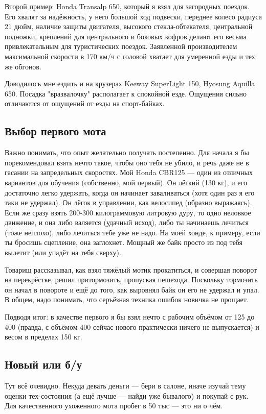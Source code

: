 \documentclass[12pt,a4paper]{article}
\begin{document}
Второй пример: Honda Transalp 650, который я взял для загородных поездок.
Его хвалят за надёжность, у него большой ход подвески, переднее колесо
радиуса 21 дюйм, наличие защиты двигателя, высокого стекла-обтекателя,
центральной подножки, креплений для центрального и боковых кофров делают
его весьма привлекательным для туристических поездок. Заявленной
производителем максимальной скорости в 170 км/ч с головой хватает для
умеренной езды и тех же обгонов.

Доводилось мне ездить и на крузерах Keeway SuperLight 150,
Hyosung Aquilla 650. Посадка "вразвалочку" располагает к спокойной езде.
Ощущения сильно отличаются от ощущений от езды на спорт-байках.

\subsection{Выбор первого мота}

Важно понимать, что опыт желательно получать постепенно. Для начала я
бы порекомендовал взять нечто такое, чтобы оно тебя не убило, и речь
даже не в гасании на запредельных скоростях. Мой Honda CBR125 --- один из
отличных вариантов для обучения (собственно, мой первый). Он лёгкий
(130 кг), и его достаточно легко удержать, когда он начинает
заваливаться (хотя один раз я его таки не удержал). Он лёгок в
управлении, как велосипед (образно выражаясь). Если же сразу взять
200-300 килограммовую литровую дуру, то одно неловкое движение, и она
либо валяется (удачный исход), либо ты начинаешь лечиться (тоже
неплохо), либо лечиться тебе уже не надо.
На моей хонде, к примеру, если ты бросишь сцепление, она заглохнет.
Мощный же байк просто из под тебя вылетит (или упадёт на тебя сверху).

Товарищ рассказывал, как взял тяжёлый мотик прокатиться, и совершая
поворот на перекрёстке, решил притормозить, пропуская пешехода.
Поскольку тормозить он начал в повороте и ещё до того, как выровнял
байк он его не удержал и упал. В общем, надо понимать, что серъёзная
техника ошибок новичка не прощает.

Подводя итог: в качестве первого я бы взял нечто с рабочим объёмом от
125 до 400 (правда, с объёмом 400 сейчас нового практически ничего не
выпускается) и весом в пределах 150 кг.

\subsection{Новый или б/у}

Тут всё очевидно. Некуда девать деньги --- бери в салоне, иначе изучай
тему оценки тех-состояния (а ещё лучше --- найди уже бывалого) и покупай
с рук. Для качественного ухоженного мота пробег в 50 тыс --- это ни о чём.
\end{document}
